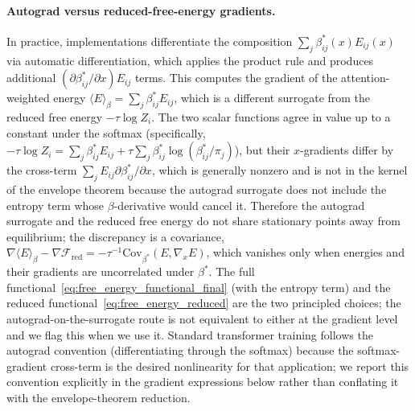 \documentclass[11pt]{article}
\begin{document}
\paragraph{Autograd versus reduced-free-energy gradients.}
In practice, implementations differentiate the composition $\sum_j \beta_{ij}^*(x)E_{ij}(x)$ via automatic differentiation, which applies the product rule and produces additional $(\partial\beta_{ij}^*/\partial x)E_{ij}$ terms. This computes the gradient of the attention-weighted energy $\langle E \rangle_\beta = \sum_j \beta_{ij}^* E_{ij}$, which is a different surrogate from the reduced free energy $-\tau\log Z_i$. The two scalar functions agree in value up to a constant under the softmax (specifically, $-\tau \log Z_i = \sum_j\beta^*_{ij}E_{ij} + \tau\sum_j\beta^*_{ij}\log(\beta^*_{ij}/\pi_j)$), but their $x$-gradients differ by the cross-term $\sum_j E_{ij} \partial\beta^*_{ij}/\partial x$, which is generally nonzero and is not in the kernel of the envelope theorem because the autograd surrogate does not include the entropy term whose $\beta$-derivative would cancel it. Therefore the autograd surrogate and the reduced free energy do not share stationary points away from equilibrium; the discrepancy is a covariance, $\nabla\langle E\rangle_\beta - \nabla\mathcal{F}_{\mathrm{red}} = -\tau^{-1}\mathrm{Cov}_{\beta^*}(E, \nabla_x E)$, which vanishes only when energies and their gradients are uncorrelated under $\beta^*$. The full functional~\eqref{eq:free_energy_functional_final} (with the entropy term) and the reduced functional~\eqref{eq:free_energy_reduced} are the two principled choices; the autograd-on-the-surrogate route is not equivalent to either at the gradient level and we flag this when we use it. Standard transformer training follows the autograd convention (differentiating through the softmax) because the softmax-gradient cross-term is the desired nonlinearity for that application; we report this convention explicitly in the gradient expressions below rather than conflating it with the envelope-theorem reduction.
\end{document}
